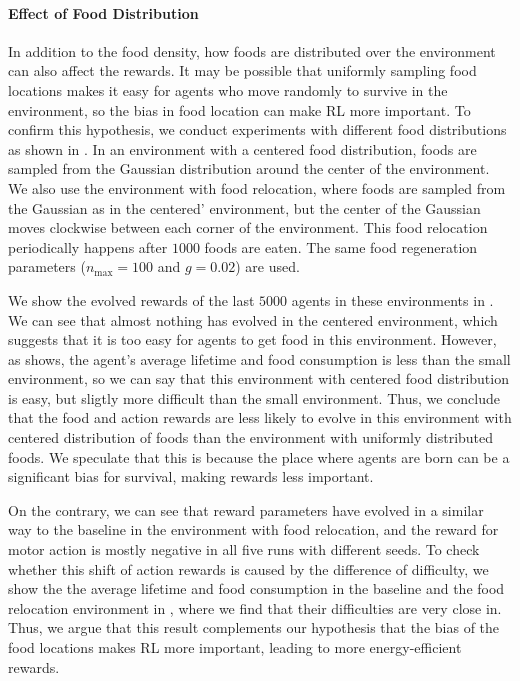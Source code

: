 \paragraph{Effect of Food Distribution}
In addition to the food density, how foods are distributed over the environment can also affect the rewards. It may be possible that uniformly sampling food locations makes it easy for agents who move randomly to survive in the environment, so the bias in food location can make RL more important. To confirm this hypothesis, we conduct experiments with different food distributions as shown in . In an environment with a centered food distribution, foods are sampled from the Gaussian distribution around the center of the environment. We also use the environment with food relocation, where foods are sampled from the Gaussian as in the centered' environment, but the center of the Gaussian moves clockwise between each corner of the environment. This food relocation periodically happens after $1000$ foods are eaten. The same food regeneration parameters ($n_{\mathrm{max}} = 100$ and $g = 0.02$) are used.

We show the evolved rewards of the last $5000$ agents in these environments in . We can see that almost nothing has evolved in the centered environment, which suggests that it is too easy for agents to get food in this environment. However, as  shows, the agent's average lifetime and food consumption is less than the small environment, so we can say that this environment with centered food distribution is easy, but sligtly more difficult than the small environment. Thus, we conclude that the food and action rewards are less likely to evolve in this environment with centered distribution of foods than the environment with uniformly distributed foods. We speculate that this is because the place where agents are born can be a significant bias for survival, making rewards less important.

On the contrary, we can see that reward parameters have evolved in a similar way to the baseline in the environment with food relocation, and the reward for motor action is mostly negative in all five runs with different seeds. To check whether this shift of action rewards is caused by the difference of difficulty, we show the the average lifetime and food consumption in the baseline and the food relocation environment in , where we find that their difficulties are very close in. Thus, we argue that this result complements our hypothesis that the bias of the food locations makes RL more important, leading to more energy-efficient rewards.

